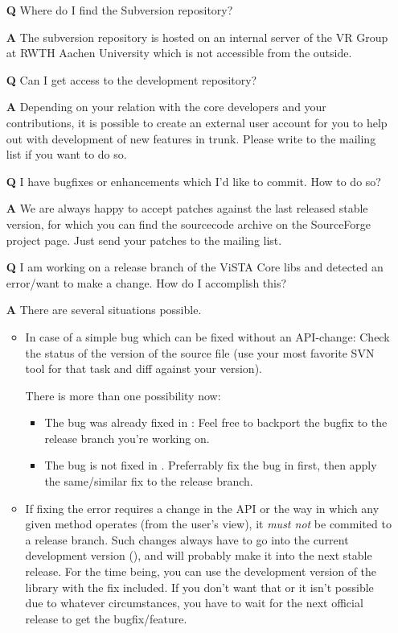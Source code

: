 \begin{itemize}

\item[\textbf{Q}] Where do I find the Subversion repository?
\item[\textbf{A}] The subversion repository is hosted on an internal server of the VR Group at RWTH Aachen University which is not accessible from the outside.

\item[\textbf{Q}] Can I get access to the development repository?
\item[\textbf{A}] Depending on your relation with the core developers and your contributions, it is possible to create an external user account for you to help out with development of new features in trunk. Please write to the mailing list if you want to do so.

\item[\textbf{Q}] I have bugfixes or enhancements which I'd like to commit. How to do so?
\item[\textbf{A}] We are always happy to accept patches against the last released stable version, for which you can find the sourcecode archive on the SourceForge project page. Just send your patches to the mailing list.

\item[\textbf{Q}] I am working on a release branch of the ViSTA Core libs and detected an error/want to make a change.
  How do I accomplish this?
\item[\textbf{A}] There are several situations possible.

  \begin{itemize}
  \item In case of a simple bug which can be fixed without an API-change:
	Check the status of the  version of the source file (use your most favorite SVN tool for that task and diff against your version).

	There is more than one possibility now:
	\begin{itemize}
	\item The bug was already fixed in :
      Feel free to backport the bugfix to the release branch you're working on.
    \item The bug is not fixed in .
	  Preferrably fix the bug in  first, then apply the same/similar fix to the release branch.
	\end{itemize}
	
  \item If fixing the error requires a change in the API or the way in which any given method operates (from the user's view), it \emph{must not} be commited to a release branch. Such changes always have to go into the current development version (), and will probably make it into the next stable release. For the time being, you can use the development version of the library with the fix included. If you don't want that or it isn't possible due to whatever circumstances, you have to wait for the next official release to get the bugfix/feature.
  \end{itemize}
\end{itemize}
